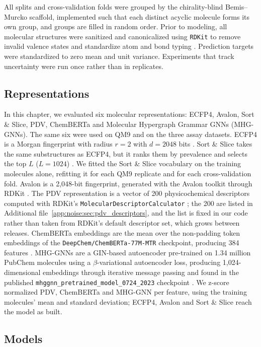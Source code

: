 All splits and cross-validation folds were grouped by the chirality-blind Bemis--Murcko scaffold, implemented such that each distinct acyclic molecule forms its own group, and groups are filled in random order. Prior to modeling, all molecular structures were sanitized and canonicalized using \texttt{RDKit} to remove invalid valence states and standardize atom and bond typing \citep{rdkit}. Prediction targets were standardized to zero mean and unit variance. Experiments that track uncertainty were run once rather than in replicates.

\subsection{Representations}

In this chapter, we evaluated six molecular representations: ECFP4, Avalon, Sort \& Slice, PDV, ChemBERTa and Molecular Hypergraph Grammar GNNs (MHG-GNNs). The same six were used on QM9 and on the three assay datasets. ECFP4 is a Morgan fingerprint with radius $r = 2$ with $d = 2048$ bits \citep{rogers2010, rdkit}. Sort \& Slice takes the same substructures as ECFP4, but it ranks them by prevalence and selects the top $L$ ($L=1024$) \citep{sns}. We fitted the Sort \& Slice vocabulary on the training molecules alone, refitting it for each QM9 replicate and for each cross-validation fold.  Avalon is a 2,048-bit fingerprint, generated with the Avalon toolkit through RDKit \citep{avalon, rdkit}. The PDV representation is a vector of 200 physicochemical descriptors computed with RDKit's \texttt{MolecularDescriptorCalculator} \citep{rdkit, Cherkasov2014}; the 200 are listed in Additional file~\ref{app:noise:sec:pdv_descriptors}, and the list is fixed in our code rather than taken from RDKit's default descriptor set, which grows between releases. ChemBERTa embeddings are the mean over the non-padding token embeddings of the \texttt{DeepChem/ChemBERTa-77M-MTR} checkpoint, producing 384 features \citep{Ahmad2022}. MHG-GNNs are a GIN-based autoencoder pre-trained on 1.34 million PubChem molecules using a $\beta$-variational autoencoder loss, producing 1,024-dimensional embeddings through iterative message passing and found in the published \texttt{mhggnn\_pretrained\_model\_0724\_2023} checkpoint \citep{kishimoto2023}. We z-score normalized PDV, ChemBERTa and MHG-GNN per feature, using the training molecules' mean and standard deviation; ECFP4, Avalon and Sort \& Slice reach the model as built.

\subsection{Models}

